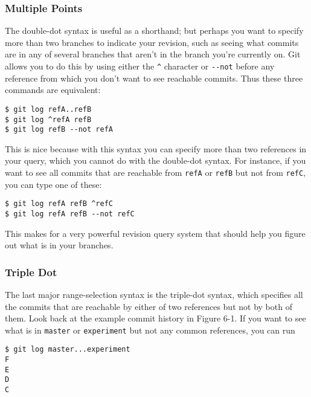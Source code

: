 \documentclass[a4paper]{book}
\begin{document}
\subsubsection{Multiple Points}

The double-dot syntax is useful as a shorthand; but perhaps you want to specify more than two branches to indicate your revision, such as seeing what commits are in any of several branches that aren't in the branch you're currently on. Git allows you to do this by using either the \texttt{\^{}} character or \texttt{-{}-not} before any reference from which you don't want to see reachable commits. Thus these three commands are equivalent:

\begin{shaded}\begin{verbatim}
$ git log refA..refB
$ git log ^refA refB
$ git log refB --not refA
\end{verbatim}\end{shaded}

This is nice because with this syntax you can specify more than two references in your query, which you cannot do with the double-dot syntax. For instance, if you want to see all commits that are reachable from \texttt{refA} or \texttt{refB} but not from \texttt{refC}, you can type one of these:

\begin{shaded}\begin{verbatim}
$ git log refA refB ^refC
$ git log refA refB --not refC
\end{verbatim}\end{shaded}

This makes for a very powerful revision query system that should help you figure out what is in your branches.

\subsubsection{Triple Dot}

The last major range-selection syntax is the triple-dot syntax, which specifies all the commits that are reachable by either of two references but not by both of them. Look back at the example commit history in Figure 6-1. If you want to see what is in \texttt{master} or \texttt{experiment} but not any common references, you can run

\begin{shaded}\begin{verbatim}
$ git log master...experiment
F
E
D
C
\end{verbatim}\end{shaded}
\end{document}
